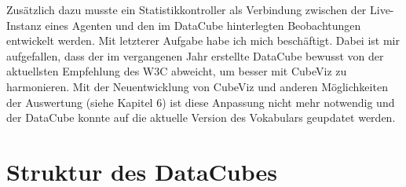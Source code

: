 \documentclass{article}
\begin{document}
 Zusätzlich dazu musste ein Statistikkontroller als Verbindung zwischen der Live-Instanz eines Agenten und den im DataCube hinterlegten Beobachtungen entwickelt werden. Mit letzterer Aufgabe habe ich mich beschäftigt. Dabei ist mir aufgefallen, dass der im vergangenen Jahr erstellte DataCube bewusst von der aktuellsten Empfehlung des W3C abweicht, um besser mit CubeViz zu harmonieren. Mit der Neuentwicklung von CubeViz und anderen Möglichkeiten der Auswertung (siehe Kapitel 6) ist diese Anpassung nicht mehr notwendig und der DataCube konnte auf die aktuelle Version des Vokabulars geupdatet werden.

\section{Struktur des DataCubes}
\end{document}
